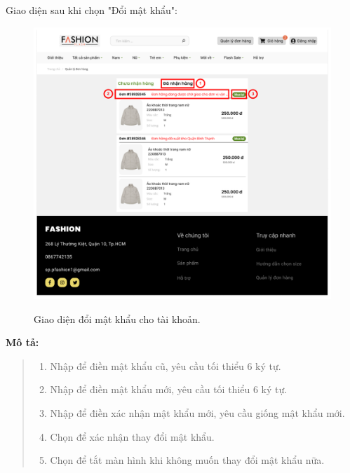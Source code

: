 \newpage

Giao diện sau khi chọn "Đổi mật khẩu":
\begin{figure}[!htp]
    \centering
    \includegraphics[width=5in]{img/UI/customer/customer_order.png}
    \label{16}
    \newline
    \caption{Giao diện đổi mật khẩu cho tài khoản.}
\end{figure}

\textbf{Mô tả:}
\begin{quote}
    \begin{enumerate}
        \item Nhập để điền mật khẩu cũ, yêu cầu tối thiểu 6 ký tự.
        \item Nhập để điền mật khẩu mới, yêu cầu tối thiểu 6 ký tự.
        \item Nhập để điền xác nhận mật khẩu mới, yêu cầu giống mật khẩu mới.
        \item Chọn để xác nhận thay đổi mật khẩu.
        \item Chọn để tắt màn hình khi không muốn thay đổi mật khẩu nữa.
    \end{enumerate}
\end{quote}

\newpage

